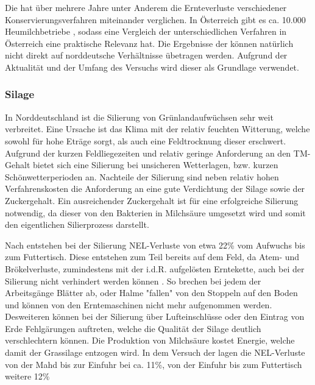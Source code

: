 Die \HBLFA hat über mehrere Jahre unter Anderem die Ernteverluste verschiedener Konservierungsverfahren miteinander verglichen.
In Österreich gibt es ca. 10.000 Heumilchbetriebe \parencite[75]{fritz2018ansatz}, sodass eine Vergleich der unterschiedlichen Verfahren in Österreich eine praktische Relevanz hat.
Die Ergebnisse der \HBLFA können natürlich nicht direkt auf norddeutsche Verhältnisse übetragen werden.
Aufgrund der Aktualität und der Umfang des Versuchs wird dieser als Grundlage verwendet. 


\subsubsection{Silage}
\label{subsub:Silage}
In Norddeutschland ist die Silierung von Grünlandaufwüchsen sehr weit verbreitet.
Eine Ursache ist das Klima mit der relativ feuchten Witterung, welche sowohl für hohe Eträge sorgt, als auch eine Feldtrocknung dieser erschwert.
Aufgrund der kurzen Feldliegezeiten und relativ geringe Anforderung an den \ac{TM}-Gehalt bietet sich eine Silierung bei unsicheren Wetterlagen, bzw. kurzen Schönwetterperioden an.
Nachteile der Silierung sind neben relativ hohen Verfahrenskosten die Anforderung an eine gute Verdichtung der Silage sowie der Zuckergehalt.
Ein ausreichender Zuckergehalt ist für eine erfolgreiche Silierung notwendig, da dieser von den Bakterien in Milchsäure umgesetzt wird und somit den eigentlichen Silierprozess darstellt.

Nach \textcite[30]{fritz2018wirtschaftliche} entstehen bei der Silierung \ac{NEL}-Verluste von etwa 22\% vom Aufwuchs bis zum Futtertisch.
Diese entstehen zum Teil bereits auf dem Feld, da Atem- und Brökelverluste, zumindestens mit der i.d.R. aufgelösten Erntekette, auch bei der Silierung nicht verhindert werden können \parencite[58f]{gruber2015einfluss}.
So brechen bei jedem der Arbeitsgänge Blätter ab, oder Halme "fallen" von den Stoppeln auf den Boden und können von den Erntemaschinen nicht mehr aufgenommen werden.
Desweiteren können bei der Silierung über Lufteinschlüsse oder den Eintrag von Erde Fehlgärungen auftreten, welche die Qualität der Silage deutlich verschlechtern können.
Die Produktion von Milchsäure kostet Energie, welche damit der Grassilage entzogen wird\parencite[61]{gruber2015einfluss}.
In dem Versuch der \HBLFA lagen die \ac{NEL}-Verluste von der Mahd bis zur Einfuhr bei ca. 11\%, von der Einfuhr bis zum Futtertisch weitere 12\% \parencite[30]{fritz2018wirtschaftliche}


